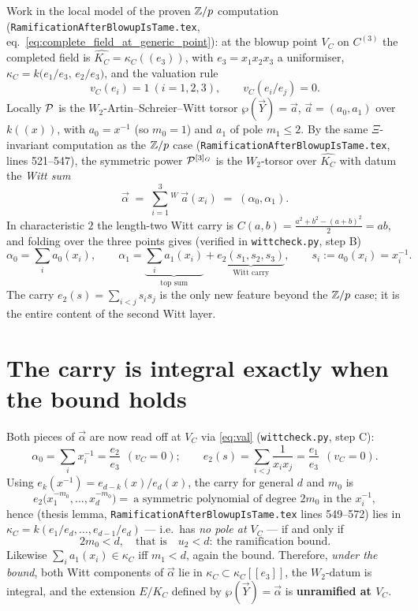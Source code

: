 \documentclass[11pt]{article}
\begin{document}
Work in the local model of the proven $\mathbb{Z}/p$ computation
(\texttt{RamificationAfterBlowupIsTame.tex}, eq.~\cref{eq:complete_field_at_generic_point}):
at the blowup point $V_C$ on $C^{(3)}$ the completed field is
$\widehat{K_C}=\kappa_C((e_3))$, with $e_3=x_1x_2x_3$ a uniformiser,
$\kappa_C=k\big(e_1/e_3,\,e_2/e_3\big)$, and the valuation rule
\begin{equation}\label{eq:val}
v_C(e_i)=1\ (i=1,2,3),\qquad v_C(e_i/e_j)=0 .
\end{equation}
Locally $\mathcal{P}$ is the $W_2$-Artin--Schreier--Witt torsor $\wp(\vec Y)=\vec a$,
$\vec a=(a_0,a_1)$ over $k((x))$, with $a_0=x^{-1}$ (so $m_0=1$) and $a_1$ of
pole $m_1\le2$. By the same $\Xi$-invariant computation as the $\mathbb{Z}/p$ case
(\texttt{RamificationAfterBlowupIsTame.tex}, lines 521--547), the symmetric
power $\mathcal{P}^{[3]_G}$ is the $W_2$-torsor over $\widehat{K_C}$ with datum the
\emph{Witt sum}
\[
\vec\alpha \;=\; \textstyle\sum_{i=1}^{3}{}^{W}\ \vec a(x_i)
\;=\;(\alpha_0,\alpha_1).
\]
In characteristic $2$ the length-two Witt carry is $C(a,b)=\tfrac{a^2+b^2-(a+b)^2}{2}=ab$,
and folding over the three points gives (verified in \texttt{wittcheck.py}, step B)
\begin{equation}\label{eq:alpha}
\alpha_0=\sum_{i}a_0(x_i),\qquad
\alpha_1=\underbrace{\sum_{i}a_1(x_i)}_{\text{top sum}}
        +\underbrace{e_2(s_1,s_2,s_3)}_{\text{Witt carry}},\qquad s_i:=a_0(x_i)=x_i^{-1}.
\end{equation}
The carry $e_2(s)=\sum_{i<j}s_is_j$ is the only new feature beyond the $\mathbb{Z}/p$
case; it is the entire content of the second Witt layer.

\section{The carry is integral exactly when the bound holds}\label{sec:carry}

Both pieces of $\vec\alpha$ are now read off at $V_C$ via \cref{eq:val}
(\texttt{wittcheck.py}, step C):
\[
\alpha_0=\sum_i x_i^{-1}=\frac{e_2}{e_3}\ \ (v_C=0);
\qquad
e_2(s)=\sum_{i<j}\frac1{x_ix_j}=\frac{e_1}{e_3}\ \ (v_C=0).
\]
Using $e_k(x^{-1})=e_{d-k}(x)/e_d(x)$, the carry for general $d$ and $m_0$ is
\begin{equation}\label{eq:carrygen}
e_2\big(x_1^{-m_0},\dots,x_d^{-m_0}\big)
=\ \text{a symmetric polynomial of degree } 2m_0 \text{ in the } x_i^{-1},
\end{equation}
hence (thesis lemma, \texttt{RamificationAfterBlowupIsTame.tex} lines 549--572)
lies in $\kappa_C=k(e_1/e_d,\dots,e_{d-1}/e_d)$ --- i.e.\ has \emph{no pole at
$V_C$} --- if and only if
\[
\boxed{\,2m_0<d,\quad\text{that is}\quad u_2<d:\ \text{the ramification bound.}\,}
\]
Likewise $\sum_i a_1(x_i)\in\kappa_C$ iff $m_1<d$, again the bound. Therefore,
\emph{under the bound}, both Witt components of $\vec\alpha$ lie in
$\kappa_C\subset\kappa_C[[e_3]]$, the $W_2$-datum is integral, and the extension
$E/K_C$ defined by $\wp(\vec Y)=\vec\alpha$ is \textbf{unramified at $V_C$}.
\end{document}
